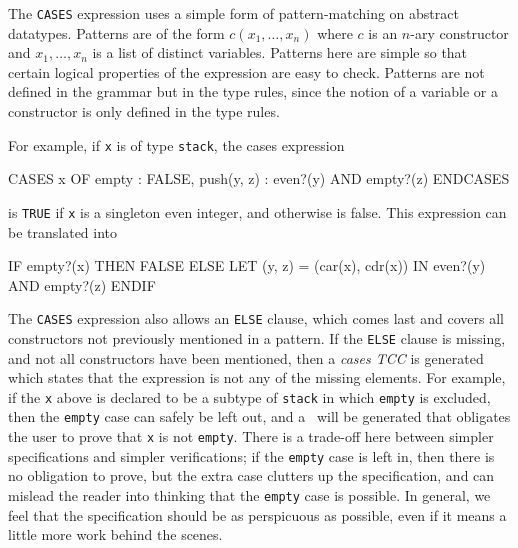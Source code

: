 The \texttt{CASES} expression uses a simple form of pattern-matching on
abstract datatypes.  Patterns are of the form $c(x_1,\ldots, x_n)$ where
$c$ is an $n$-ary constructor and $x_1,\ldots, x_n$ is a list of distinct
variables.  Patterns here are simple so that certain logical properties of
the expression are easy to check.  Patterns are not defined in the grammar
but in the type rules, since the notion of a variable or a constructor is
only defined in the type rules.

For example, if \texttt{x} is of type \texttt{stack}, the cases expression
\begin{pvsex}
  CASES x OF
    empty : FALSE,
    push(y, z) : even?(y) AND empty?(z)
  ENDCASES
\end{pvsex}
is \texttt{TRUE} if \texttt{x} is a singleton even integer, and otherwise is
false.  This expression can be translated into
\begin{pvsex}
  IF empty?(x)
     THEN FALSE
     ELSE LET (y, z) = (car(x), cdr(x))
           IN even?(y) AND empty?(z)
  ENDIF
\end{pvsex}

The \texttt{CASES} expression also allows an \texttt{ELSE} clause, which
comes last and covers all constructors not previously mentioned in a
pattern.  If the \texttt{ELSE} clause is missing, and not all constructors
have been mentioned, then a \emph{cases TCC} is generated which states that the expression is not
any of the missing elements.  For example, if the \texttt{x} above is
declared to be a subtype of \texttt{stack} in which \texttt{empty} is
excluded, then the \texttt{empty} case can safely be left out, and a \tcc\
will be generated that obligates the user to prove that \texttt{x} is not
\texttt{empty}.  There is a trade-off here between simpler specifications
and simpler verifications; if the \texttt{empty} case is left in, then
there is no obligation to prove, but the extra case clutters up the
specification, and can mislead the reader into thinking that the
\texttt{empty} case is possible.  In general, we feel that the
specification should be as perspicuous as possible, even if it means a
little more work behind the scenes.

